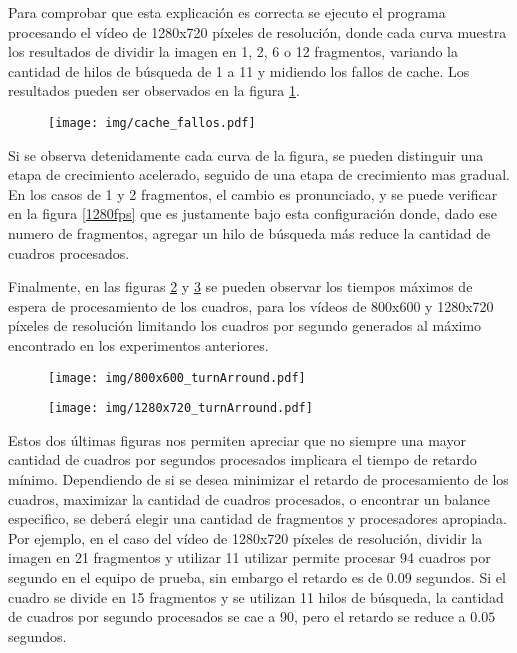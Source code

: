 Para comprobar que esta explicación es correcta se ejecuto el programa
procesando el vídeo de 1280x720 píxeles de resolución, donde cada curva muestra
los resultados de dividir la imagen en 1, 2, 6 o 12 fragmentos, variando la
cantidad de hilos de búsqueda de 1 a 11 y midiendo los fallos de cache. Los
resultados pueden ser observados en la figura \ref{cacheFallos}.

\begin{figure}[!h]

	\texttt{[image: img/cache\_fallos.pdf]}
	\caption{}
	\label{cacheFallos}

\end{figure}

Si se observa detenidamente cada curva de la figura, se pueden distinguir una
etapa de crecimiento acelerado, seguido de una etapa de crecimiento mas gradual.
En los casos de 1 y 2 fragmentos, el cambio es pronunciado, y se puede verificar
en la figura \ref{1280fps} que es justamente bajo esta configuración donde, dado
ese numero de fragmentos, agregar un hilo de búsqueda más reduce la cantidad de
cuadros procesados.

Finalmente, en las figuras \ref{800turnArround} y \ref{1280turnArround} se
pueden observar los tiempos máximos de espera de procesamiento de los cuadros,
para los vídeos de 800x600 y 1280x720 píxeles de resolución limitando los
cuadros por segundo generados al máximo encontrado en los experimentos
anteriores.

\begin{figure}[!h]

	\texttt{[image: img/800x600\_turnArround.pdf]}
	\caption{}
	\label{800turnArround}

\end{figure}


\begin{figure}[!h]

	\texttt{[image: img/1280x720\_turnArround.pdf]}
	\caption{}
	\label{1280turnArround}

\end{figure}

Estos dos últimas figuras nos permiten apreciar que no siempre una mayor
cantidad de cuadros por segundos procesados implicara el tiempo de retardo
mínimo. Dependiendo de si se desea minimizar el retardo de procesamiento de los
cuadros, maximizar la cantidad de cuadros procesados, o encontrar un balance
especifico, se deberá elegir una cantidad de fragmentos y procesadores
apropiada. Por ejemplo, en el caso del vídeo de 1280x720 píxeles de resolución,
dividir la imagen en 21 fragmentos y utilizar 11 utilizar permite procesar 94
cuadros por segundo en el equipo de prueba, sin embargo el retardo es de $0.09$
segundos. Si el cuadro se divide en 15 fragmentos y se utilizan 11 hilos de
búsqueda, la cantidad de cuadros por segundo procesados se cae a 90, pero el
retardo se reduce a $0.05$ segundos.
